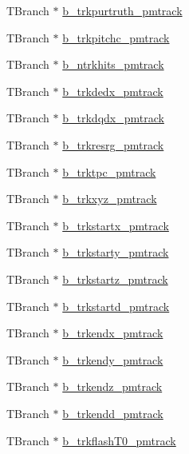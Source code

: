 \begin{DoxyCompactItemize}
\item 
T\-Branch $\ast$ \hyperlink{classanatree_a91198758c18ed18f94592df4d7fbfe92}{b\-\_\-trkpurtruth\-\_\-pmtrack}
\item 
T\-Branch $\ast$ \hyperlink{classanatree_a033271b448b4fa957039e353e6bec94e}{b\-\_\-trkpitchc\-\_\-pmtrack}
\item 
T\-Branch $\ast$ \hyperlink{classanatree_aeb9c12f33af0fa99e2faa6c95159e5b0}{b\-\_\-ntrkhits\-\_\-pmtrack}
\item 
T\-Branch $\ast$ \hyperlink{classanatree_a4adf161c4f3d1b6cec0b1079c9c1c2f3}{b\-\_\-trkdedx\-\_\-pmtrack}
\item 
T\-Branch $\ast$ \hyperlink{classanatree_a2167299195a8fb353cef9317eb7c906f}{b\-\_\-trkdqdx\-\_\-pmtrack}
\item 
T\-Branch $\ast$ \hyperlink{classanatree_a04e1dfa2edc89aa709d0590e4972a0f4}{b\-\_\-trkresrg\-\_\-pmtrack}
\item 
T\-Branch $\ast$ \hyperlink{classanatree_a97716e216669415dde8244d2f83ef5d1}{b\-\_\-trktpc\-\_\-pmtrack}
\item 
T\-Branch $\ast$ \hyperlink{classanatree_add9fa6b08ec7c82a607874df0213c0f3}{b\-\_\-trkxyz\-\_\-pmtrack}
\item 
T\-Branch $\ast$ \hyperlink{classanatree_a3b8f32fcce6093b6a82ea3a8748bca54}{b\-\_\-trkstartx\-\_\-pmtrack}
\item 
T\-Branch $\ast$ \hyperlink{classanatree_a6226fc0736403da9aadece560924558b}{b\-\_\-trkstarty\-\_\-pmtrack}
\item 
T\-Branch $\ast$ \hyperlink{classanatree_a7f7d7969b71f67616244c35371bd7479}{b\-\_\-trkstartz\-\_\-pmtrack}
\item 
T\-Branch $\ast$ \hyperlink{classanatree_a3a1a6ec73c344b941019367ecb89e108}{b\-\_\-trkstartd\-\_\-pmtrack}
\item 
T\-Branch $\ast$ \hyperlink{classanatree_ad2fc7561e9a2e3863a7d62a8b7525f39}{b\-\_\-trkendx\-\_\-pmtrack}
\item 
T\-Branch $\ast$ \hyperlink{classanatree_a3300720e9ea9e8ca3e7b648caf2b1114}{b\-\_\-trkendy\-\_\-pmtrack}
\item 
T\-Branch $\ast$ \hyperlink{classanatree_a8987b8eed2e0f9ac5dccee1eee8507a5}{b\-\_\-trkendz\-\_\-pmtrack}
\item 
T\-Branch $\ast$ \hyperlink{classanatree_a601a500778c2722c487fd097a326e53c}{b\-\_\-trkendd\-\_\-pmtrack}
\item 
T\-Branch $\ast$ \hyperlink{classanatree_a76df837d69832b19d63e7d8de1083f87}{b\-\_\-trkflash\-T0\-\_\-pmtrack}

\end{DoxyCompactItemize}
